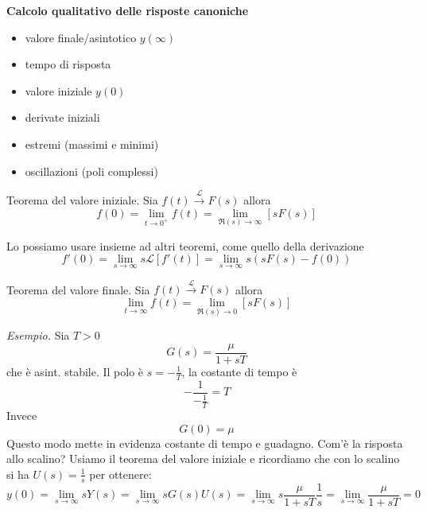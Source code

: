 \documentclass[10pt,a4paper]{book}
\begin{document}
\textbf{Calcolo qualitativo delle risposte canoniche}
\begin{itemize}
	\item valore finale/asintotico $y(\infty)$
	\item tempo di risposta
	\item valore iniziale $y(0)$
	\item derivate iniziali
	\item estremi (massimi e minimi)
	\item oscillazioni (poli complessi)
\end{itemize}
\begin{theorem}{Teorema del valore iniziale.}{}
	Sia $f(t)\xrightarrow{\mathcal{L}} F(s)$ allora
	\begin{equation*}
		\boxed{f(0) =\lim _{t\rightarrow 0^{+}} f(t) =\lim _{\Re(s)\rightarrow \infty }[ sF(s)]}
	\end{equation*}
\end{theorem}
Lo possiamo usare insieme ad altri teoremi, come quello della derivazione
\begin{equation*}
	f'(0) =\lim _{s\rightarrow \infty } s\mathcal{L}[ f'(t)] =\lim _{s\rightarrow \infty } s(sF(s) -f(0))
\end{equation*}
\begin{theorem}{Teorema del valore finale.}{}
	Sia $f(t)\xrightarrow{\mathcal{L}} F(s)$ allora
	\begin{equation*}
		\boxed{\lim _{t\rightarrow \infty } f(t) =\lim _{\Re(s)\rightarrow 0}[ sF(s)]}
	\end{equation*}
\end{theorem}
\textit{Esempio.} Sia $T >0$
\begin{equation*}
	G(s) =\frac{\mu }{1+sT}
\end{equation*}
che è asint. stabile. Il polo è $s=-\frac{1}{T}$, la costante di tempo è
\begin{equation*}
	-\frac{1}{-\frac{1}{T}} =T
\end{equation*}
Invece
\begin{equation*}
	G(0) =\mu 
\end{equation*}
Questo modo mette in evidenza costante di tempo e guadagno. Com'è la risposta allo scalino? Usiamo il teorema del valore iniziale e ricordiamo che con lo scalino si ha $U(s) =\frac{1}{s}$ per ottenere:
\begin{equation*}
	y(0) =\lim _{s\rightarrow \infty } sY(s) =\lim _{s\rightarrow \infty } sG(s) U(s) =\lim _{s\rightarrow \infty } s\frac{\mu }{1+sT}\frac{1}{s} =\lim _{s\rightarrow \infty }\frac{\mu }{1+sT} =0
\end{equation*}
\end{document}
